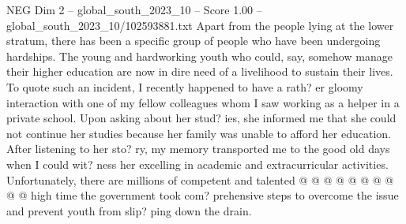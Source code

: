 \begin{textsample}{NEG Dim 2 – global\_south\_2023\_10 – Score 1.00 – global\_south\_2023\_10/102593881.txt}
Apart from the people lying at the lower stratum, there has been a specific group of people who have been undergoing hardships.
The young and hardworking youth who could, say, somehow manage their higher education are now in dire need of a livelihood to sustain their lives.
To quote such an incident, I recently happened to have a rath? er gloomy interaction with one of my fellow colleagues whom I saw working as a helper in a private school.
Upon asking about her stud? ies, she informed me that she could not continue her studies because her family was unable to afford her education.
After listening to her sto? ry, my memory transported me to the good old days when I could wit? ness her excelling in academic and extracurricular activities.
Unfortunately, there are millions of competent and talented @ @ @ @ @ @ @ @ @ @ high time the government took com? prehensive steps to overcome the issue and prevent youth from slip? ping down the drain.

\end{textsample}

